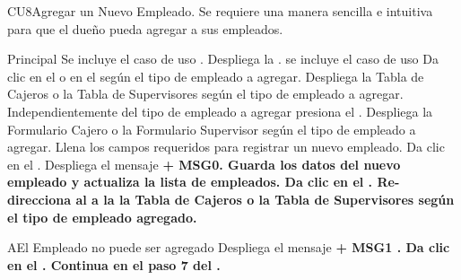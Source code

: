 \begin{UseCase}{CU8}{Agregar un Nuevo Empleado.}{
		Se requiere una manera sencilla e intuitiva para que el dueño pueda agregar a sus empleados.
	}
	\end{UseCase}
	\begin{UCtrayectoria}{Principal}
		\UCpaso Se incluye el caso de uso .
		\UCpaso Despliega la .
		\UCpaso se incluye el caso de uso 
		\UCpaso[\UCactor] Da clic en el  o en el  según el tipo de empleado a agregar.
		\UCpaso Despliega la  {Tabla de Cajeros} o la  {Tabla de Supervisores} según el tipo de empleado a agregar.
		\UCpaso[\UCactor] Independientemente del tipo de empleado a agregar presiona el .
		\UCpaso Despliega la  {Formulario Cajero} o la  {Formulario Supervisor} según el tipo de empleado a agregar.
		\UCpaso [\UCactor] Llena los campos requeridos para registrar un nuevo empleado. 
		\UCpaso[\UCactor] Da clic en el  .
		\UCpaso Despliega el mensaje \bf {+ MSG0}. 
		\UCpaso Guarda los datos del nuevo empleado y actualiza la lista de empleados.
		\UCpaso[\UCactor] Da clic en el .
		\UCpaso Re-direcciona al \UCactor a la la  {Tabla de Cajeros} o la  {Tabla de Supervisores} según el tipo de empleado agregado.
	\end{UCtrayectoria}


		\begin{UCtrayectoriaA}{A}{El Empleado no puede ser agregado}
			\UCpaso Despliega el mensaje \bf {+ MSG1 }.
			\UCpaso[\UCactor] Da clic en el .
			\UCpaso Continua en el paso 7 del .
		\end{UCtrayectoriaA}

